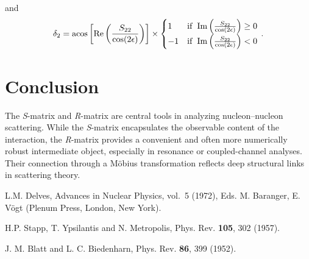 \documentclass[10pt,a4paper]{article}
\begin{document}
	and 
	\begin{equation}
		\delta_2 =
		\acos\left[\Re\left(\frac{S_{22}}{\cos(2\epsilon)}\right)\right]
		\times
		\begin{cases}
			1 & \mathrm{if~}\Im\left(\frac{S_{22}}{\cos(2\epsilon)}\right) \ge 0 \\
			-1 & \mathrm{if~}\Im\left(\frac{S_{22}}{\cos(2\epsilon)}\right) < 0
		\end{cases}\,.
	\end{equation}
	
	
	
	\section{Conclusion}
	
	The \textit{S}-matrix and \textit{R}-matrix are central tools in analyzing nucleon--nucleon scattering. While the \textit{S}-matrix encapsulates the observable content of the interaction, the \textit{R}-matrix provides a convenient and often more numerically robust intermediate object, especially in resonance or coupled-channel analyses. Their connection through a M\"obius transformation reflects deep structural links in scattering theory.
	
	
	\begin{thebibliography}{9}
		L.M. Delves, Advances in Nuclear Physics, vol.~5 (1972), Eds. M. Baranger, E. V\"ogt (Plenum Press, London, New York).
		
		H.P. Stapp, T. Ypsilantis and N. Metropolis, Phys. Rev. \textbf{105}, 302 (1957).
		
		J. M. Blatt and L. C. Biedenharn, Phys. Rev. \textbf{86}, 399 (1952).
		
		
	\end{thebibliography}
	
\end{document}
